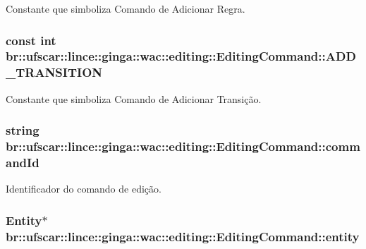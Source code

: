 Constante que simboliza Comando de Adicionar Regra. 

\hypertarget{classbr_1_1ufscar_1_1lince_1_1ginga_1_1wac_1_1editing_1_1EditingCommand_ad768e449f54846893a10f6faa233bc8b}{
\subsubsection[{ADD\_\-TRANSITION}]{\setlength{\rightskip}{0pt plus 5cm}const int {\bf br::ufscar::lince::ginga::wac::editing::EditingCommand::ADD\_\-TRANSITION}}}
\label{classbr_1_1ufscar_1_1lince_1_1ginga_1_1wac_1_1editing_1_1EditingCommand_ad768e449f54846893a10f6faa233bc8b}


Constante que simboliza Comando de Adicionar Transição. 

\hypertarget{classbr_1_1ufscar_1_1lince_1_1ginga_1_1wac_1_1editing_1_1EditingCommand_a09a15f483ebab3fc72138c656329b293}{
\subsubsection[{commandId}]{\setlength{\rightskip}{0pt plus 5cm}string {\bf br::ufscar::lince::ginga::wac::editing::EditingCommand::commandId}}}
\label{classbr_1_1ufscar_1_1lince_1_1ginga_1_1wac_1_1editing_1_1EditingCommand_a09a15f483ebab3fc72138c656329b293}


Identificador do comando de edição. 

\hypertarget{classbr_1_1ufscar_1_1lince_1_1ginga_1_1wac_1_1editing_1_1EditingCommand_a080922002fe90bf99390c026e8e99e52}{
\subsubsection[{entity}]{\setlength{\rightskip}{0pt plus 5cm}Entity$\ast$ {\bf br::ufscar::lince::ginga::wac::editing::EditingCommand::entity}}}
\label{classbr_1_1ufscar_1_1lince_1_1ginga_1_1wac_1_1editing_1_1EditingCommand_a080922002fe90bf99390c026e8e99e52}


